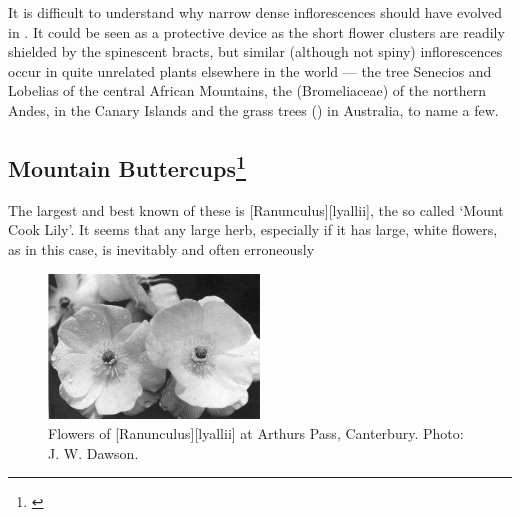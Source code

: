 It is difficult to understand why narrow dense inflorescences should have evolved in .
It could be seen as a protective device as the short flower clusters are readily shielded by the spinescent bracts, but similar (although not spiny) inflorescences occur in quite unrelated plants elsewhere in the world --- the tree Senecios and Lobelias of the central African Mountains, the  (Bromeliaceae) of the northern Andes,  in the Canary Islands and the grass trees () in Australia, to name a few.

\subsection[Mountain Buttercups]{Mountain Buttercups\footnote{\cite{fisher1965alpine}}}

The largest and best known of these is [Ranunculus][lyallii], the so called `Mount Cook Lily'.
It seems that any large herb, especially if it has large, white flowers, as in this case, is inevitably and often erroneously

\begin{figure}
	\includegraphics[width=0.5\textwidth]{graphics/figure99ranunculus.jpg}
	\centering
	\caption[Flowers of \emph{Ranunculus lyallii}]{Flowers of [Ranunculus][lyallii] at Arthurs Pass, Canterbury.
	Photo: J. W. Dawson.}%
	\label{fig:99ranunculus}
\end{figure}

